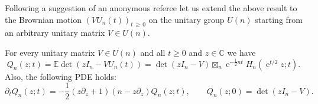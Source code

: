 \documentclass[AHL,Unicode,longabstracts,published]{cedram}
\DeclareMathOperator{\eee}{e}
\newcommand{\E}{\mathbb{E}}
\newcommand{\C}{\mathbb{C}}
\begin{document}
Following a suggestion of an anonymous referee let us extend the above result to the Brownian motion $(V U_n(t))_{t\,\geq\,0}$ on the unitary group $U(n)$ starting from an arbitrary unitary matrix $V\in U(n)$.

\begin{coro}\label{cor:unitary_BM}
For every unitary matrix $V\in U(n)$ and all $t\geq 0$ and $z\in \C$ we have
\begin{equation}\label{eq:Q_n_def_char_poly_BM_unitary_group}
Q_n(z; t) = \E \det(z I_n - V U_n(t)) =
\det (z I_n-V) \boxtimes_n \eee^{-\frac 12 n t} H_n\left(\eee^{t/2}z; t\right).
\end{equation}
Also, the following PDE holds:
\begin{equation}\label{eq:PDE_unitary_BM}
\partial_t Q_n(z;t) = - \frac 12 (z \partial_z + 1) (n-z\partial_z) Q_n(z;t),\qquad Q_n(z;0) = \det (z I_n-V).
\end{equation}
\end{coro}
\end{document}
